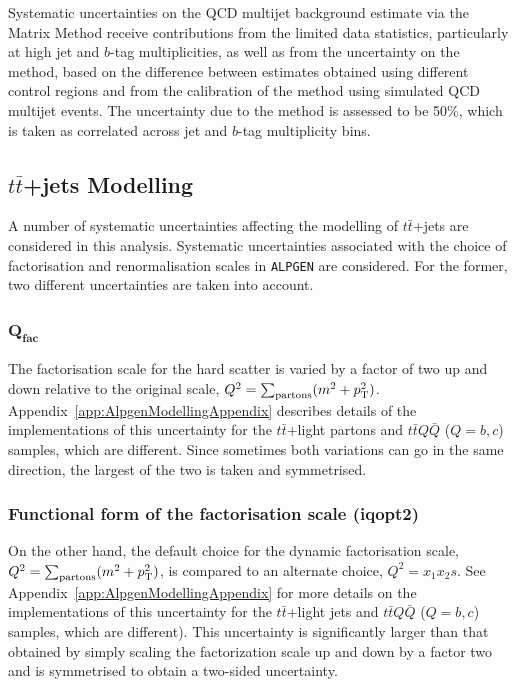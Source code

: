 Systematic uncertainties on the QCD multijet background 
estimate via the Matrix Method receive
contributions from the limited data statistics, 
particularly at high jet and $b$-tag multiplicities, as
well as from the uncertainty on the method, based on 
the difference between estimates obtained using 
different control regions and from the calibration 
of the method using simulated QCD multijet events.
The uncertainty due to the method is assessed to be 
50\%, which is taken as correlated across jet
and $b$-tag multiplicity bins. 




\subsection{$t\bar{t}$+jets Modelling}
\label{sec:syst_ttbarmodelHTX}

A number of systematic uncertainties affecting 
the modelling of $t\bar{t}$+jets are considered
in this analysis. Systematic uncertainties associated 
with the choice of factorisation and renormalisation 
scales in \texttt{ALPGEN} are considered. For the former, 
two different uncertainties are taken into account.
\subsubsection*{$\mathbf{Q_{fac}}$}
The factorisation scale for the hard scatter is varied by a factor of two up and down relative to the
original scale, $Q^2=\sum_{\rm partons} (m^2 + \pt^2)$.
\ifIsINT 
Appendix~\ref{app:AlpgenModellingAppendix} describes details of the
implementations of this uncertainty for the $t\bar{t}$+light partons and $t\bar{t}Q\bar{Q}$ ($Q=b,c$) samples, which are different.
\fi
Since sometimes both variations can go in the same direction, the largest of the two is taken and symmetrised.

\subsubsection*{Functional form of the factorisation scale (iqopt2)} 
On the other hand, the default choice for the dynamic factorisation scale,
$Q^2=\sum_{\rm partons} (m^2 + \pt^2)$,  is compared to an alternate choice, $Q^2=x_1 x_2 s$.
\ifIsINT
See Appendix~\ref{app:AlpgenModellingAppendix} for more details on the implementations of this uncertainty 
for the $t\bar{t}$+light jets and $t\bar{t}Q\bar{Q}$ ($Q=b,c$) samples, which are different).
\fi
This uncertainty is significantly larger than that obtained by simply scaling the factorization scale up and down by a factor two 
and is symmetrised to obtain a two-sided uncertainty.

